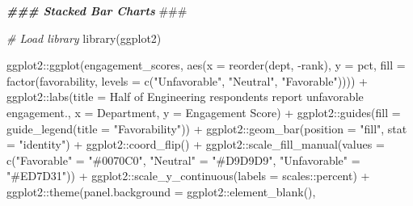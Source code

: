 \documentclass[
]{book}
\newenvironment{Shaded}{\begin{snugshade}}{\end{snugshade}}
\newcommand{\AlertTok}[1]{\textcolor[rgb]{0.94,0.16,0.16}{#1}}
\newcommand{\AttributeTok}[1]{\textcolor[rgb]{0.77,0.63,0.00}{#1}}
\newcommand{\CommentTok}[1]{\textcolor[rgb]{0.56,0.35,0.01}{\textit{#1}}}
\newcommand{\DocumentationTok}[1]{\textcolor[rgb]{0.56,0.35,0.01}{\textbf{\textit{#1}}}}
\newcommand{\FunctionTok}[1]{\textcolor[rgb]{0.00,0.00,0.00}{#1}}
\newcommand{\NormalTok}[1]{#1}
\newcommand{\OtherTok}[1]{\textcolor[rgb]{0.56,0.35,0.01}{#1}}
\newcommand{\SpecialCharTok}[1]{\textcolor[rgb]{0.00,0.00,0.00}{#1}}
\newcommand{\StringTok}[1]{\textcolor[rgb]{0.31,0.60,0.02}{#1}}
\begin{document}
\begin{Shaded}
\begin{Highlighting}[]
\DocumentationTok{\#\#\# Stacked Bar Charts }\AlertTok{\#\#\#}

\CommentTok{\# Load library}
\FunctionTok{library}\NormalTok{(ggplot2)}

\NormalTok{ggplot2}\SpecialCharTok{::}\FunctionTok{ggplot}\NormalTok{(engagement\_scores, }\FunctionTok{aes}\NormalTok{(}\AttributeTok{x =} \FunctionTok{reorder}\NormalTok{(dept, }\SpecialCharTok{{-}}\NormalTok{rank), }\AttributeTok{y =}\NormalTok{ pct, }\AttributeTok{fill =} \FunctionTok{factor}\NormalTok{(favorability, }\AttributeTok{levels =} \FunctionTok{c}\NormalTok{(}\StringTok{"Unfavorable"}\NormalTok{, }\StringTok{"Neutral"}\NormalTok{, }\StringTok{"Favorable"}\NormalTok{)))) }\SpecialCharTok{+}
\NormalTok{ggplot2}\SpecialCharTok{::}\FunctionTok{labs}\NormalTok{(}\AttributeTok{title =} \StringTok{\textquotesingle{}Half of Engineering respondents report unfavorable engagement.\textquotesingle{}}\NormalTok{, }\AttributeTok{x =} \StringTok{\textquotesingle{}Department\textquotesingle{}}\NormalTok{, }\AttributeTok{y =} \StringTok{\textquotesingle{}Engagement Score\textquotesingle{}}\NormalTok{) }\SpecialCharTok{+}
\NormalTok{ggplot2}\SpecialCharTok{::}\FunctionTok{guides}\NormalTok{(}\AttributeTok{fill =} \FunctionTok{guide\_legend}\NormalTok{(}\AttributeTok{title =} \StringTok{"Favorability"}\NormalTok{)) }\SpecialCharTok{+}
\NormalTok{ggplot2}\SpecialCharTok{::}\FunctionTok{geom\_bar}\NormalTok{(}\AttributeTok{position =} \StringTok{"fill"}\NormalTok{, }\AttributeTok{stat =} \StringTok{"identity"}\NormalTok{) }\SpecialCharTok{+}
\NormalTok{ggplot2}\SpecialCharTok{::}\FunctionTok{coord\_flip}\NormalTok{() }\SpecialCharTok{+}
\NormalTok{ggplot2}\SpecialCharTok{::}\FunctionTok{scale\_fill\_manual}\NormalTok{(}\AttributeTok{values =} \FunctionTok{c}\NormalTok{(}\StringTok{"Favorable"} \OtherTok{=} \StringTok{"\#0070C0"}\NormalTok{,}
                                      \StringTok{"Neutral"} \OtherTok{=} \StringTok{"\#D9D9D9"}\NormalTok{,}
                                      \StringTok{"Unfavorable"} \OtherTok{=} \StringTok{"\#ED7D31"}\NormalTok{)) }\SpecialCharTok{+}
\NormalTok{ggplot2}\SpecialCharTok{::}\FunctionTok{scale\_y\_continuous}\NormalTok{(}\AttributeTok{labels =}\NormalTok{ scales}\SpecialCharTok{::}\NormalTok{percent) }\SpecialCharTok{+}
\NormalTok{ggplot2}\SpecialCharTok{::}\FunctionTok{theme}\NormalTok{(}\AttributeTok{panel.background =}\NormalTok{ ggplot2}\SpecialCharTok{::}\FunctionTok{element\_blank}\NormalTok{(),}

\end{Highlighting}
\end{Shaded}
\end{document}
